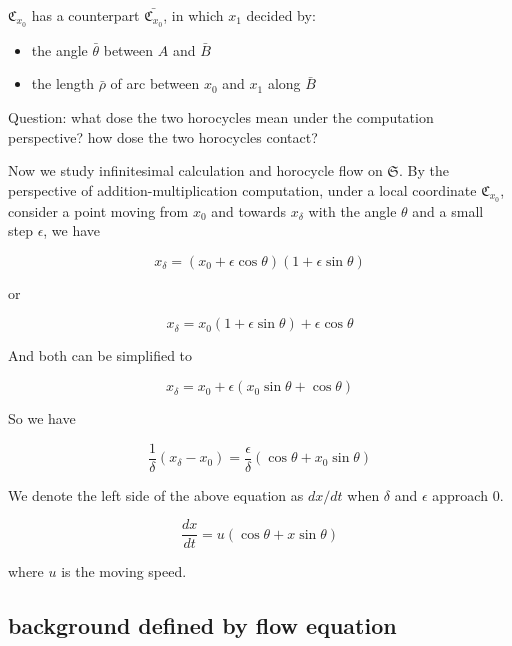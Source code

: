 \documentclass{article}
\begin{document}
$\mathfrak{C}_{x_0}$ has a counterpart $\bar{\mathfrak{C}_{x_0}}$, in which $x_1$ decided by:
\begin{itemize}
    \item the angle $\bar{\theta}$ between $A$ and $\bar{B}$
    \item the length $\bar{\rho}$ of arc between $x_0$ and $x_1$ along $\bar{B}$
\end{itemize}

Question: what dose the two horocycles mean under the computation perspective? how dose the two horocycles contact?

Now we study infinitesimal calculation and horocycle flow on $\mathfrak{S}$. By the perspective of
addition-multiplication computation, under a local coordinate $\mathfrak{C}_{x_0}$,
consider a point moving from $x_0$ and towards $x_{\delta}$ with the angle $\theta$ and a small step $\epsilon$, we have

\begin{equation}
    x_{\delta} = (x_0 + \epsilon \cos \theta)(1 + \epsilon \sin \theta)
\end{equation}

or

\begin{equation}
    x_{\delta} = x_0 (1 + \epsilon \sin \theta) + \epsilon \cos \theta
\end{equation}

And both can be simplified to

\begin{equation}
    x_{\delta} = x_0 + \epsilon (x_0 \sin \theta + \cos \theta)
\end{equation}

So we have

\begin{equation}
    \frac{1}{\delta} (x_{\delta} - x_0) = \frac{\epsilon}{\delta} (\cos \theta + x_0 \sin \theta)
\end{equation}

We denote the left side of the above equation as $dx / dt$ when $\delta$ and $\epsilon$ approach 0.

\begin{equation}
    \frac{dx}{dt} = u (\cos \theta + x \sin \theta)
    \label{eqn:flow}
\end{equation}

where $u$ is the moving speed.

\subsection{background defined by flow equation}\label{sec:}
\end{document}
